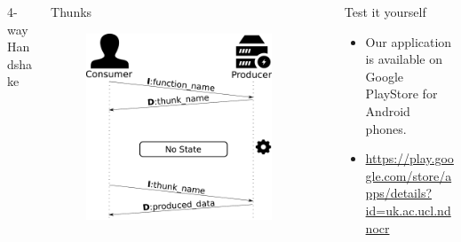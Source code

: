 \documentclass[final]{beamer}
\newlength{\sepwid}
\newlength{\onecolwid}
\newlength{\twocolwid}
\begin{document}
\begin{frame}[t]
\begin{columns}[t]
\begin{column}{\twocolwid}
\begin{columns}
\begin{column}{\onecolwid}
\begin{block}{4-way Handshake}
\end{block}

\end{column}

\begin{column}{\onecolwid}
\begin{block}{Thunks}
\begin{figure}
\includegraphics[width=0.8\linewidth]{img/thunks}
\end{figure}
\end{block}
\end{column}

\end{columns}



\end{column} %

\begin{column}{\sepwid}\end{column} %

\begin{column}{\onecolwid} %


\begin{block}{Test it yourself}
\begin{itemize}
 \item Our application is available on Google PlayStore for Android phones.
 \item \url{https://play.google.com/store/apps/details?id=uk.ac.ucl.ndnocr}
\end{itemize}


\end{block}
\end{column}
\end{columns}
\end{frame}
\end{document}
